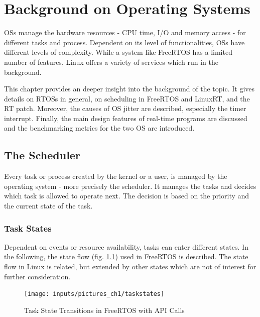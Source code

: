 \chapter{Background on Operating Systems}\label{ch_background}
\acp{OS} manage the hardware resources - \ac{CPU} time, \ac{I/O} and memory access  - for different tasks and process. 
Dependent on its level of functionalities, \acp{OS} have different levels of complexity.
While a system like FreeRTOS has a limited number of features, Linux offers a variety of services which run in the background. 
\par

This chapter provides an deeper insight into the background of the topic. 
It gives details on \acp{RTOS} in general, on scheduling in FreeRTOS and LinuxRT, and the RT patch. 
Moreover, the causes of \ac{OS} jitter are described, especially the timer interrupt. 
Finally, the main design features of real-time programs are discussed and the benchmarking metrics for the two \ac{OS} are introduced. 

\section{The Scheduler}\label{s_scheduler}
Every task or process created by the kernel or a user, is managed by the operating system - more precisely the scheduler. 
It manages the tasks and decides which task is allowed to operate next. 
The decision is based on the priority and the current state of the task. 

\subsection{Task States}\label{ss_task_states}
Dependent on events or resource availability, tasks can enter different states. 
In the following, the state flow (fig. \ref{fig_taskstates}) used in FreeRTOS \cite{freertos} is described. 
The state flow in Linux is related, but extended by other states which are not of interest for further consideration. 

\begin{figure}[htb]
	\begin{center}
		\texttt{[image: inputs/pictures\_ch1/taskstates]}
	\end{center}
	\caption[Task State Transitions in FreeRTOS]{Task State Transitions in FreeRTOS with API Calls \cite{freertos}} \label{fig_taskstates}
\end{figure}


